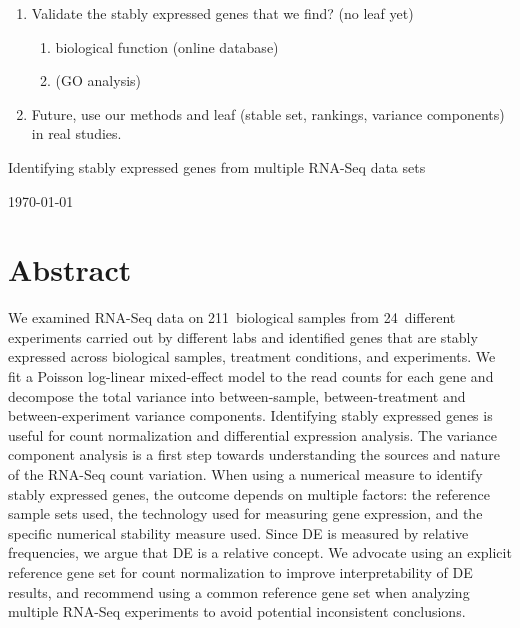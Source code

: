 \documentclass[letterpaper,12pt]{article}
\newcommand{\howmanySamples}{211~}
\newcommand{\howmanylab}{24~}
\begin{document}
\begin{enumerate}
    \item
	Validate the stably expressed genes that we find? (no leaf yet) 
	\begin{enumerate}
	    \item
		biological function (online database) 
	    \item
		(GO analysis)
	\end{enumerate}

    \item
	Future, use our methods and leaf (stable set, rankings, variance
	components) in real studies.
\end{enumerate}

\newpage

\begin{center}

{\Large Identifying stably expressed genes from multiple RNA-Seq data sets}

\today

\end{center}


\newpage
\section*{Abstract}
We examined RNA-Seq data on \howmanySamples biological samples from \howmanylab different
experiments carried out by different labs and identified genes that are stably
expressed across biological samples, treatment conditions, and experiments. We
fit a Poisson log-linear mixed-effect model to the read counts for each gene
and decompose the total variance into between-sample, between-treatment and
between-experiment variance components. Identifying stably expressed genes is
useful for count normalization and differential expression analysis. The
variance component analysis is a first step towards understanding the sources
and nature of the RNA-Seq count variation.
When using a numerical measure to identify stably expressed genes, the outcome
depends on multiple factors: the reference sample sets used, the technology
used for measuring gene expression, and the specific numerical stability
measure used.  Since DE is measured by relative frequencies, we argue that DE
is a relative concept. We advocate using an explicit reference gene set for
count normalization to improve interpretability of DE results, and recommend
using a common reference gene set when analyzing multiple RNA-Seq experiments
to avoid potential inconsistent conclusions.
\end{document}
